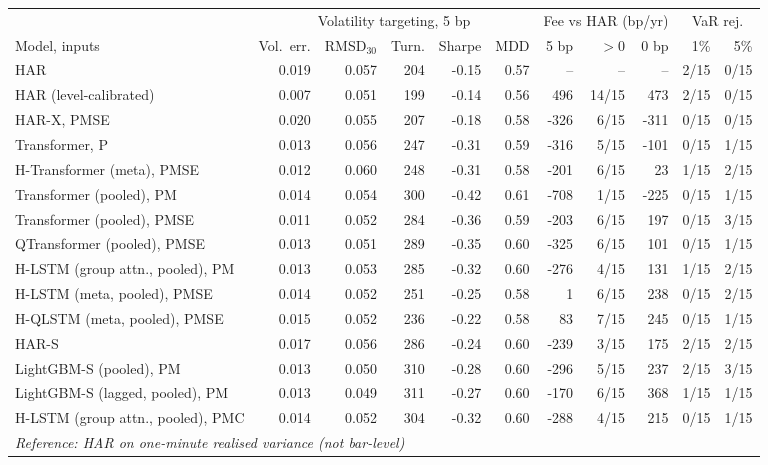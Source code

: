 \begin{tabular}{lrrrrrrrrrr}
\toprule
 & \multicolumn{5}{c}{Volatility targeting, 5 bp} & \multicolumn{3}{c}{Fee vs HAR (bp/yr)} & \multicolumn{2}{c}{VaR rej.} \\
\cmidrule(lr){2-6}\cmidrule(lr){7-9}\cmidrule(lr){10-11}
Model, inputs & Vol.\ err. & RMSD$_{30}$ & Turn. & Sharpe & MDD & 5 bp & $>0$ & 0 bp & 1\% & 5\% \\
\midrule
HAR & 0.019 & 0.057 & 204 & -0.15 & 0.57 & -- & -- & -- & 2/15 & 0/15 \\
HAR (level-calibrated) & 0.007 & 0.051 & 199 & -0.14 & 0.56 & 496 & 14/15 & 473 & 2/15 & 0/15 \\
HAR-X, PMSE & 0.020 & 0.055 & 207 & -0.18 & 0.58 & -326 & 6/15 & -311 & 0/15 & 0/15 \\
Transformer, P & 0.013 & 0.056 & 247 & -0.31 & 0.59 & -316 & 5/15 & -101 & 0/15 & 1/15 \\
H-Transformer (meta), PMSE & 0.012 & 0.060 & 248 & -0.31 & 0.58 & -201 & 6/15 & 23 & 1/15 & 2/15 \\
Transformer (pooled), PM & 0.014 & 0.054 & 300 & -0.42 & 0.61 & -708 & 1/15 & -225 & 0/15 & 1/15 \\
Transformer (pooled), PMSE & 0.011 & 0.052 & 284 & -0.36 & 0.59 & -203 & 6/15 & 197 & 0/15 & 3/15 \\
QTransformer (pooled), PMSE & 0.013 & 0.051 & 289 & -0.35 & 0.60 & -325 & 6/15 & 101 & 0/15 & 1/15 \\
H-LSTM (group attn., pooled), PM & 0.013 & 0.053 & 285 & -0.32 & 0.60 & -276 & 4/15 & 131 & 1/15 & 2/15 \\
H-LSTM (meta, pooled), PMSE & 0.014 & 0.052 & 251 & -0.25 & 0.58 & 1 & 6/15 & 238 & 0/15 & 2/15 \\
H-QLSTM (meta, pooled), PMSE & 0.015 & 0.052 & 236 & -0.22 & 0.58 & 83 & 7/15 & 245 & 0/15 & 1/15 \\
HAR-S & 0.017 & 0.056 & 286 & -0.24 & 0.60 & -239 & 3/15 & 175 & 2/15 & 2/15 \\
LightGBM-S (pooled), PM & 0.013 & 0.050 & 310 & -0.28 & 0.60 & -296 & 5/15 & 237 & 2/15 & 3/15 \\
LightGBM-S (lagged, pooled), PM & 0.013 & 0.049 & 311 & -0.27 & 0.60 & -170 & 6/15 & 368 & 1/15 & 1/15 \\
H-LSTM (group attn., pooled), PMC & 0.014 & 0.052 & 304 & -0.32 & 0.60 & -288 & 4/15 & 215 & 0/15 & 1/15 \\
\midrule
\multicolumn{11}{l}{\emph{Reference: HAR on one-minute realised variance (not bar-level)}} \\

\end{tabular}
